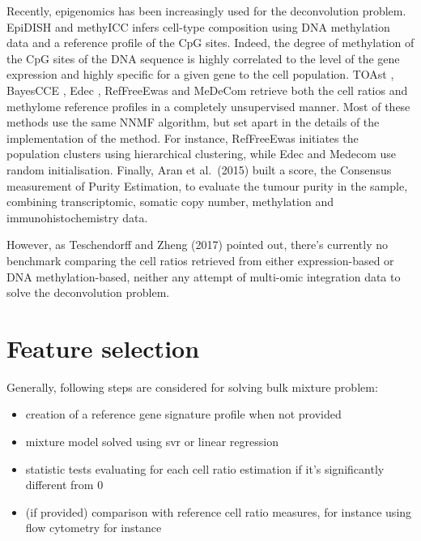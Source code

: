 Recently, epigenomics has been increasingly used for the deconvolution
problem. EpiDISH
\autocite{teschendorff_etal17} and methyICC \autocite{hicks_irizarry19} infers cell-type composition using DNA methylation data
and a reference profile of the CpG sites. Indeed, the degree of
methylation of the CpG sites of the DNA sequence is highly correlated to
the level of the gene expression and highly specific for a given gene to
the cell population. TOA\acrshort{st} \autocite{li_etal19}, BayesCCE \autocite{rahmani_etal18}, Edec \autocite{onuchic_etal16}, RefFreeEwas
\autocite{houseman_etal16} and MeDeCom \autocite{lutsik_etal17}
retrieve both the cell ratios and methylome reference profiles in a
completely unsupervised manner. Most of these methods use the same NNMF
algorithm, but set apart in the details of the implementation of the
method. For instance, RefFreeEwas initiates the population clusters
using hierarchical clustering, while Edec and Medecom use random
initialisation. Finally, Aran et al.~(2015) built a score, the Consensus
measurement of Purity Estimation, to evaluate the tumour purity in the
sample, combining transcriptomic, somatic copy number, methylation and
immunohistochemistry data.

However, as Teschendorff and Zheng (2017) pointed out, there's currently
no benchmark comparing the cell ratios retrieved from either
expression-based or DNA methylation-based, neither any attempt of
multi-omic integration data to solve the deconvolution problem.


\section{Feature selection}
\label{sec:feature-selection}


Generally, following steps are considered for solving bulk mixture problem:

\begin{itemize}

\item
  creation of a reference gene signature profile when not provided
\item
  mixture model solved using svr or linear regression
\item
  statistic tests evaluating for each cell ratio estimation if it's
  significantly different from 0
\item
  (if provided) comparison with reference cell ratio measures, for
  instance using flow cytometry for instance
\end{itemize}


